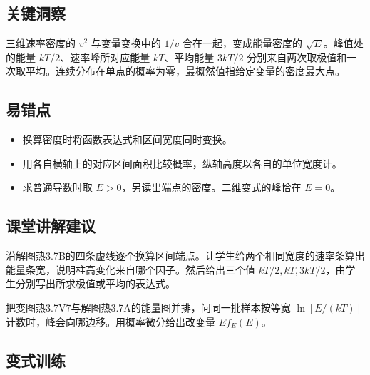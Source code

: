 \documentclass[UTF8,fontset=fandol,a4paper,11pt]{ctexart}
\begin{document}


\subsection*{关键洞察}

三维速率密度的 $v^2$ 与变量变换中的 $1/v$ 合在一起，变成能量密度的 $\sqrt E$。峰值处的能量 $kT/2$、速率峰所对应能量 $kT$、平均能量 $3kT/2$ 分别来自两次取极值和一次取平均。连续分布在单点的概率为零，最概然值指给定变量的密度最大点。



\subsection*{易错点}

\begin{itemize}
\item 换算密度时将函数表达式和区间宽度同时变换。
\item 用各自横轴上的对应区间面积比较概率，纵轴高度以各自的单位宽度计。
\item 求普通导数时取 $E>0$，另读出端点的密度。二维变式的峰恰在 $E=0$。
\end{itemize}



\subsection*{课堂讲解建议}

沿解图热3.7B的四条虚线逐个换算区间端点。让学生给两个相同宽度的速率条算出能量条宽，说明柱高变化来自哪个因子。然后给出三个值 $kT/2,kT,3kT/2$，由学生分别写出所求极值或平均的表达式。

把变图热3.7V7与解图热3.7A的能量图并排，问同一批样本按等宽 $\ln[E/(kT)]$ 计数时，峰会向哪边移。用概率微分给出改变量 $E f_E(E)$。



\subsection*{变式训练}
\end{document}
